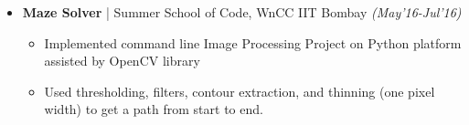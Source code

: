 \documentclass[a4paper, 10pt]{article}
\newcommand{\isep}{-2 pt}
\begin{document}
\begin{itemize}
\vspace{-0.18cm}

\item \textbf{\large Maze Solver} | Summer School of Code, WnCC IIT Bombay \hfill \emph{(May'16-Jul'16)} \\
	\begin{itemize}\itemsep \isep
	
	\vspace{-0.70cm}
		\item Implemented command line Image Processing Project on Python platform assisted by OpenCV library
\item Used thresholding, filters, contour extraction, and thinning (one pixel width) to get a path from start to end.
	\end{itemize}


\end{itemize}
\end{document}
